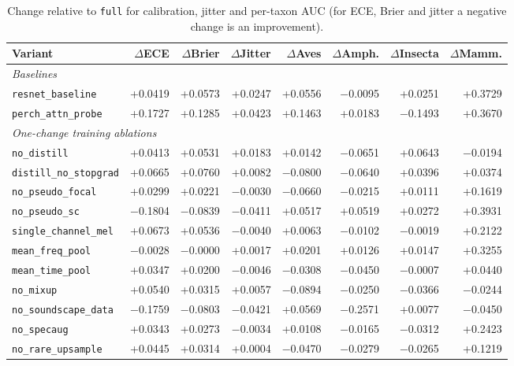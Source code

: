 \begin{table}[H]\centering\small
\caption{Change relative to \texttt{full} for calibration, jitter and per-taxon AUC (for ECE, Brier and jitter a negative change is an improvement).}\label{tab:delta_calib}
\setlength{\tabcolsep}{3.5pt}
\begin{adjustbox}{max width=\linewidth}
\begin{tabular}{lrrrrrrr}
\toprule
Variant & $\Delta$ECE & $\Delta$Brier & $\Delta$Jitter & $\Delta$Aves & $\Delta$Amph. & $\Delta$Insecta & $\Delta$Mamm. \\
\midrule
\multicolumn{8}{l}{\emph{Baselines}} \\
\texttt{resnet\_baseline} & +0.0419 & +0.0573 & +0.0247 & +0.0556 & $-$0.0095 & +0.0251 & +0.3729 \\
\texttt{perch\_attn\_probe} & +0.1727 & +0.1285 & +0.0423 & +0.1463 & +0.0183 & $-$0.1493 & +0.3670 \\
\midrule
\multicolumn{8}{l}{\emph{One-change training ablations}} \\
\texttt{no\_distill} & +0.0413 & +0.0531 & +0.0183 & +0.0142 & $-$0.0651 & +0.0643 & $-$0.0194 \\
\texttt{distill\_no\_stopgrad} & +0.0665 & +0.0760 & +0.0082 & $-$0.0800 & $-$0.0640 & +0.0396 & +0.0374 \\
\texttt{no\_pseudo\_focal} & +0.0299 & +0.0221 & $-$0.0030 & $-$0.0660 & $-$0.0215 & +0.0111 & +0.1619 \\
\texttt{no\_pseudo\_sc} & $-$0.1804 & $-$0.0839 & $-$0.0411 & +0.0517 & +0.0519 & +0.0272 & +0.3931 \\
\texttt{single\_channel\_mel} & +0.0673 & +0.0536 & $-$0.0040 & +0.0063 & $-$0.0102 & $-$0.0019 & +0.2122 \\
\texttt{mean\_freq\_pool} & $-$0.0028 & $-$0.0000 & +0.0017 & +0.0201 & +0.0126 & +0.0147 & +0.3255 \\
\texttt{mean\_time\_pool} & +0.0347 & +0.0200 & $-$0.0046 & $-$0.0308 & $-$0.0450 & $-$0.0007 & +0.0440 \\
\texttt{no\_mixup} & +0.0540 & +0.0315 & +0.0057 & $-$0.0894 & $-$0.0250 & $-$0.0366 & $-$0.0244 \\
\texttt{no\_soundscape\_data} & $-$0.1759 & $-$0.0803 & $-$0.0421 & +0.0569 & $-$0.2571 & +0.0077 & $-$0.0450 \\
\texttt{no\_specaug} & +0.0343 & +0.0273 & $-$0.0034 & +0.0108 & $-$0.0165 & $-$0.0312 & +0.2423 \\
\texttt{no\_rare\_upsample} & +0.0445 & +0.0314 & +0.0004 & $-$0.0470 & $-$0.0279 & $-$0.0265 & +0.1219 \\

\end{tabular}
\end{adjustbox}
\end{table}
